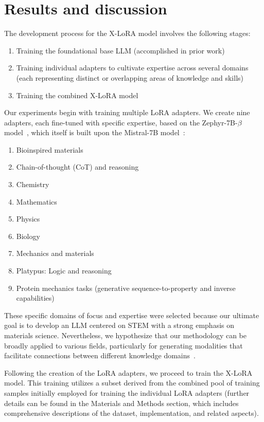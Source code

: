 \section{Results and discussion}

The development process for the X-LoRA model involves the following stages:

\begin{enumerate}
    \item Training the foundational base LLM (accomplished in prior work) \item Training individual adapters to cultivate expertise across several domains (each representing distinct or overlapping areas of knowledge and skills) \item Training the combined X-LoRA model
\end{enumerate}

Our experiments begin with training multiple LoRA adapters. We create nine adapters, each fine-tuned with specific expertise, based on the Zephyr-7B-$\beta$ model~\cite{HuggingFaceH4/zephyr-7b-betaFace}, which itself is built upon the Mistral-7B model~\cite{Jiang2023Mistral7B}:

\begin{enumerate}
    \item Bioinspired materials \item Chain-of-thought (CoT) and reasoning \item Chemistry \item Mathematics \item Physics \item Biology \item Mechanics and materials \item Platypus: Logic and reasoning \item Protein mechanics tasks (generative sequence-to-property and inverse capabilities)
\end{enumerate}

These specific domains of focus and expertise were selected because our ultimate goal is to develop an LLM centered on STEM with a strong emphasis on materials science. Nevertheless, we hypothesize that our methodology can be broadly applied to various fields, particularly for generating modalities that facilitate connections between different knowledge domains~\cite{Buehler2023MechGPTModalities,Buehler2023MeLMProblemsb}.

Following the creation of the LoRA adapters, we proceed to train the X-LoRA model. This training utilizes a subset derived from the combined pool of training samples initially employed for training the individual LoRA adapters (further details can be found in the Materials and Methods section, which includes comprehensive descriptions of the dataset, implementation, and related aspects).

